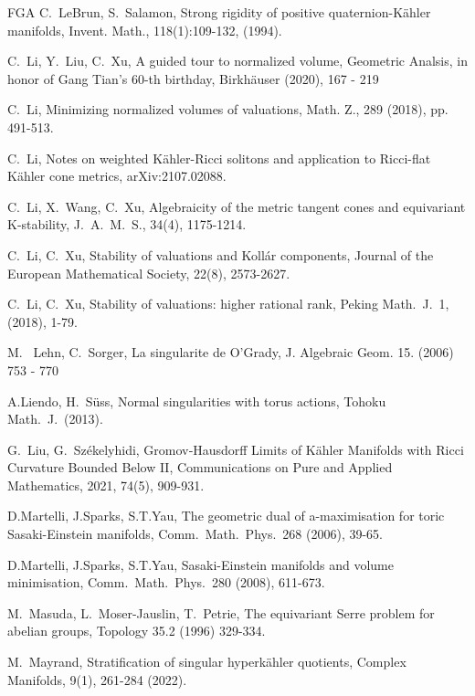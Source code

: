 \documentclass[12pt,a4paper]{amsart}
\theoremstyle{remark}
\theoremstyle{definition}
\begin{document}
\begin{thebibliography}{FGA}
C.~LeBrun, S.~Salamon, 
Strong rigidity of positive quaternion-K\"ahler manifolds, 
Invent. Math., 118(1):109-132, (1994).

  C.~Li, Y.~Liu, C.~Xu,  A guided tour to normalized volume,  Geometric Analsis, in honor of Gang Tian's 60-th 
birthday, Birkh\"auser (2020), 167 - 219  



C.~Li, 
Minimizing normalized volumes of valuations, 
Math. Z., 289 (2018), pp. 491-513. 

C.~Li, Notes on weighted K\"{a}hler-Ricci solitons and 
application to Ricci-flat K\"{a}hler cone metrics,  
arXiv:2107.02088. 

C.~Li, X.~Wang, C.~Xu, 
Algebraicity of the metric tangent cones and equivariant K-stability, J.\ A.\ M.\ S., 34(4), 1175-1214.

C.~Li, C.~Xu, 
Stability of valuations and Koll\'ar components, 
Journal of the European Mathematical Society, 22(8), 2573-2627.

C.~Li, C.~Xu, Stability of valuations: higher 
rational rank, 
Peking Math.\ J.\, 1, (2018), 1-79.

 M.~ Lehn, C.~Sorger, La singularite de O'Grady, J. Algebraic Geom. 15. (2006) 753 - 770 

A.Liendo, H.~S\"uss, 
Normal singularities with torus actions, 
Tohoku Math.\ J.\ (2013). 

G.~Liu, G.~Sz\'ekelyhidi, Gromov‐Hausdorff Limits of 
K\"ahler Manifolds with Ricci Curvature Bounded Below 
II, Communications on Pure and Applied Mathematics, 
2021, 74(5), 909-931. 


D.Martelli, J.Sparks, S.T.Yau, 
The geometric dual of a-maximisation for toric Sasaki-Einstein manifolds, 
Comm.\ Math.\ Phys.\ 268 (2006), 39-65. 


D.Martelli, J.Sparks, S.T.Yau, 
Sasaki-Einstein manifolds and volume minimisation, 
Comm.\ Math.\ Phys.\ 280 (2008), 611-673. 

M.~Masuda, L.~Moser-Jauslin, T.~Petrie, 
The equivariant Serre problem for abelian groups, 
Topology 35.2 (1996) 329-334. 

M.~Mayrand, Stratification of singular hyperk\"ahler quotients, Complex Manifolds, 9(1), 261-284 
(2022). 


\end{thebibliography}
\end{document}
